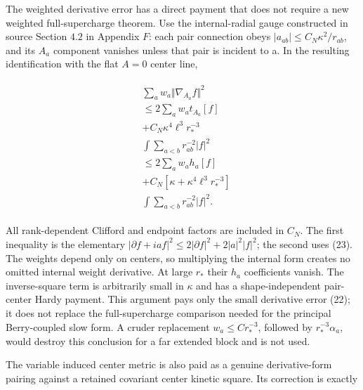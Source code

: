 The weighted derivative error has a direct payment that does not require
a new weighted full-supercharge theorem. Use the internal-radial gauge
constructed in source Section \(4.2\) in Appendix \(F\): each pair
connection obeys \(\vert a_{ab}\vert \le C_{N} \kappa ^{2}/r_{ab}\), and
its \(A_{a}\) component vanishes unless that pair is incident to a. In
the resulting identification with the flat \(A=0\) center line,

\begin{gather*}
\begin{aligned}
& \sum _{a} w_{a} \Vert \nabla _{A_{a}}f\Vert ^{2} \\
& \le 2 \sum _{a} w_{a} t_{A_{a}}[f] \\
& +C_{N} \kappa ^{4} \ell ^{3} r_{*}^{-3} \\
& \int  \sum _{a<b}r_{ab}^{-2}\vert f\vert ^{2} \\
& \le 2 \sum _{a} w_{a} h_{a}[f] \\
& +C_{N} [\kappa +\kappa ^{4} \ell ^{3} r_{*}^{-3}] \\
& \int  \sum _{a<b}r_{ab}^{-2}\vert f\vert ^{2}.
\end{aligned}\tag{26}
\end{gather*}

All rank-dependent Clifford and endpoint factors are included in
\(C_{N}\). The first inequality is the elementary
\(\vert \partial  f+i a f\vert ^{2}\le 2\vert \partial  f\vert ^{2}+2\vert a\vert ^{2}\vert f\vert ^{2}\);
the second uses (23). The weights depend only on centers, so multiplying
the internal form creates no omitted internal weight derivative. At
large \(r_{*}\) their \(h_{a}\) coefficients vanish. The inverse-square
term is arbitrarily small in \(\kappa\) and has a shape-independent
pair-center Hardy payment. This argument pays only the small derivative
error (22); it does not replace the full-supercharge comparison needed
for the principal Berry-coupled slow form. A cruder replacement
\(w_{a}\le C r_{*}^{-3}\), followed by \(r_{*}^{-3} \alpha _{a}\), would
destroy this conclusion for a far extended block and is not used.

The variable induced center metric is also paid as a genuine
derivative-form pairing against a retained covariant center kinetic
square. Its correction is exactly

